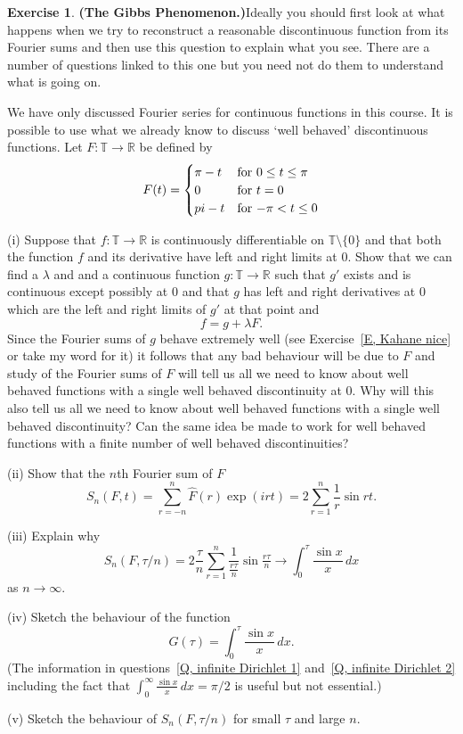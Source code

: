 \documentclass[12pt]{article}
\theoremstyle{definition}
\newtheorem{question}{Exercise}[section]
\begin{document}
\begin{question}{\bf (The Gibbs Phenomenon.)}\label{E, Gibbs}
Ideally you should first look at what happens
when we try to reconstruct a reasonable
discontinuous function from its Fourier sums
and then use this question to explain what you see.
There are a number of questions linked to this one
but you need not do them to understand what is going on.

We have only discussed Fourier
series for continuous functions in this course.
It is possible to use what we already know
to discuss `well behaved' discontinuous
functions. Let $F:{\mathbb T}\rightarrow{\mathbb R}$
be defined by
\begin{equation*}
F(t)=
\begin{cases}
\pi-t&\text{for $0\leq t\leq\pi$}\\
0&\text{for $t=0$}\\
\-pi-t&\text{for $-\pi<t\leq 0$}
\end{cases}
\end{equation*}

(i) Suppose that  $f:{\mathbb T}\rightarrow{\mathbb R}$
is continuously differentiable
on ${\mathbb T}\setminus\{0\}$ and that both the
function $f$ and its derivative have left and right
limits at $0$. Show that we can find a $\lambda$
and  and a
continuous function $g:{\mathbb T}\rightarrow{\mathbb R}$
such that $g'$ exists and is continuous
except possibly at $0$ and that
$g$ has left and right derivatives at $0$ which
are the left and right limits of $g'$ at that point
and
\[f=g+\lambda F.\]
Since the Fourier sums of $g$ behave extremely well
(see Exercise~\ref{E, Kahane nice} or take my word for it)
it follows that any bad behaviour will be due to $F$
and study of the Fourier sums of $F$ will tell us all
we need to know about well behaved functions with a
single well behaved discontinuity at $0$. Why
will this also tell us all
we need to know about well behaved functions with a
single well behaved discontinuity? Can the same
idea be made to work for well behaved functions with a
finite number of well behaved discontinuities?

(ii) Show that the $n$th Fourier sum of $F$
\[S_{n}(F,t)=\sum_{r=-n}^{n}\hat{F}(r)\exp(irt)
=2\sum_{r=1}^{n}\frac{1}{r}\sin rt.\]

(iii) Explain why
\[S_{n}(F,\tau/n)
=2\frac{\tau}{n}\sum_{r=1}^{n}\frac{1}{\tfrac{r\tau}{n}}
\sin\tfrac{r\tau}{n}\rightarrow\int_{0}^{\tau}\frac{\sin x}{x}\,dx\]
as $n\rightarrow\infty$.

(iv) Sketch the behaviour of the function
\[G(\tau)=\int_{0}^{\tau}\frac{\sin x}{x}\,dx.\]
(The information in questions~\ref{Q, infinite Dirichlet 1}
and~\ref{Q, infinite Dirichlet 2} including the fact that
$\int_{0}^{\infty}\frac{\sin x}{x}\,dx=\pi/2$ is useful
but not essential.)

(v) Sketch the behaviour of $S_{n}(F,\tau/n)$ for small
$\tau$ and large $n$.

\end{question}
\end{document}
